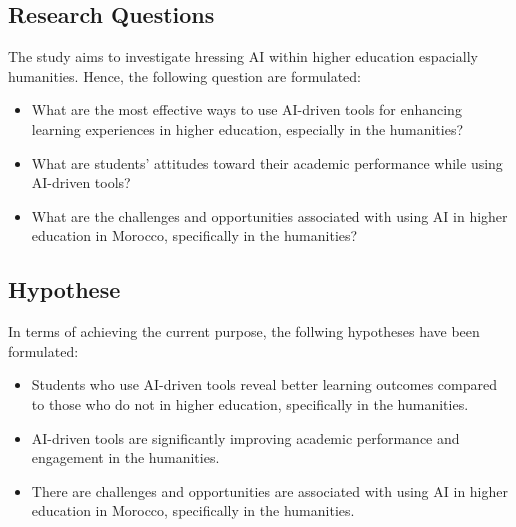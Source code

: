 \subsection{Research Questions}
The study aims to investigate hressing AI within higher education espacially humanities. Hence,
the following question are formulated:
\begin{itemize}
	\item What are the most effective ways to use AI-driven
	      tools for enhancing learning experiences in higher education,
	      especially in the humanities?
	\item What are students’ attitudes toward their academic performance
	      while using AI-driven tools?
	\item What are the challenges and opportunities associated
	      with using AI in higher education in Morocco,
	      specifically in the humanities?
\end{itemize}

\subsection{Hypothese}
In terms of achieving the current purpose, the follwing hypotheses have been formulated:
\begin{itemize}
	\item Students who use AI-driven tools reveal better learning outcomes
	      compared to those who do not in higher education, specifically in the humanities.
	\item AI-driven tools are significantly improving academic
	      performance and engagement in the humanities.
	\item There are challenges and opportunities are associated with using AI in higher
	      education in Morocco, specifically in the humanities.
\end{itemize}

